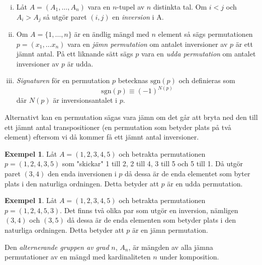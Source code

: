 \documentclass{article}
\theoremstyle{definition}
\newtheorem{exmp}[thm]{Exempel}
\begin{document}
\begin{mydef}{}{}
  \begin{enumerate}[(i)]
    \item Låt $A = (A_1, \ldots, A_n)$ vara en $n$-tupel av $n$ distinkta tal. Om $i < j$ och $A_i > A_j$ så utgör paret $(i, j)$ en \textit{inversion} i A.
    \item Om $A = \{1, \ldots, n\}$ är en ändlig mängd med $n$ element så sägs permutationen $p = (x_1, \ldots x_n)$ vara en \textit{jämn permutation}
    om antalet inversioner av $p$ är ett jämnt antal. På ett liknande sätt sägs $p$ vara en \textit{udda permutation} om antalet inversioner av $p$ är udda.
    \item \textit{Signaturen} för en permutation $p$ betecknas $\text{sgn}(p)$ och definieras som 
    \[\text{sgn}(p) \equiv (-1)^{N(p)}\]
    där $N(p)$ är inversionsantalet i $p$.   
  \end{enumerate}
\end{mydef}
Alternativt kan en permutation sägas vara jämn om det går att bryta ned den till ett jämnt antal transpositioner (en permutation som betyder plats på 
två element) eftersom vi då kommer få ett jämnt antal inversioner.
\begin{exmp}
  Låt $A = (1, 2, 3, 4, 5)$ och betrakta permutationen 
  $p = (1, 2, 4, 3, 5)$ som "skickar" 1 till 2, 2 till 4, 3 till 5 och 5 till 1. Då utgör paret $(3, 4)$ den enda inversionen i $p$ då 
  dessa är de enda elementet som byter plats i den naturliga ordningen. Detta betyder att $p$ är en udda permutation.
\end{exmp}

\begin{exmp}
  Låt $A = (1, 2, 3, 4, 5)$ och betrakta permutationen $p = (1, 2, 4, 5, 3)$. Det finns två olika par som utgör en inversion, nämligen 
  $(3, 4)$ och $(3, 5)$ då dessa är de enda elementen som betyder plats i den naturliga ordningen. Detta betyder att $p$ är en jämn permutation.
\end{exmp}

\begin{mydef}{}{}
  Den \textit{alternerande gruppen av grad }$n$, $A_n$, är mängden av alla jämna permutationer av en mängd med kardinaliteten $n$ under komposition. 
\end{mydef}
\end{document}
